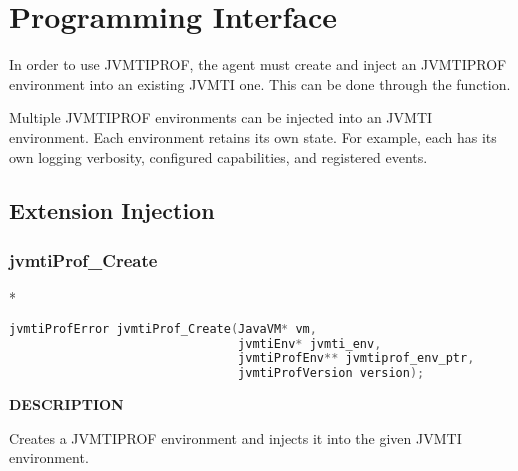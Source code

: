 


\section{Programming Interface} \label{sec:api}

In order to use JVMTIPROF, the agent must create and inject an JVMTIPROF environment into an existing JVMTI one. This can be done through the \hyperref[api:jvmtiProf_Create]{} function.

Multiple JVMTIPROF environments can be injected into an JVMTI environment. Each environment retains its own state. For example, each has its own logging verbosity, configured capabilities, and registered events.





\subsection{Extension Injection}


\subsubsection*{jvmtiProf\_Create} \label{api:jvmtiProf_Create} *

\bigskip
\begin{lstlisting}[language=C++]
jvmtiProfError jvmtiProf_Create(JavaVM* vm,
                                jvmtiEnv* jvmti_env,
                                jvmtiProfEnv** jvmtiprof_env_ptr,
                                jvmtiProfVersion version);
\end{lstlisting}

\bigskip
\noindent \textbf{DESCRIPTION}

Creates a JVMTIPROF environment and injects it into the given JVMTI environment.

